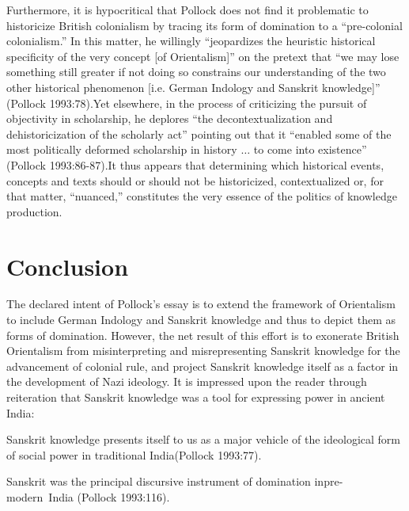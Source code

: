 Furthermore, it is hypocritical that Pollock does not find it problematic to historicize British colonialism by tracing its form of domination to a “pre-colonial colonialism.” In this matter, he willingly “jeopardizes the heuristic historical specificity of the very concept [of Orientalism]” on the pretext that “we may lose something still greater if not doing so constrains our understanding of the two other historical phenomenon [i.e. German Indology and Sanskrit knowledge]” (Pollock 1993:78).Yet elsewhere, in the process of criticizing the pursuit of objectivity in scholarship, he deplores “the decontextualization and dehistoricization of the scholarly act” pointing out that it “enabled some of the most politically deformed scholarship in history $\ldots$ to come into existence” (Pollock 1993:86-87).It thus appears that determining which historical events, concepts and texts should or should not be historicized, contextualized or, for that matter, “nuanced,” constitutes the very essence of the politics of knowledge production.

\section*{Conclusion}

The declared intent of Pollock’s essay is to extend the framework of Orientalism to include German Indology and Sanskrit knowledge and thus to depict them as forms of domination. However, the net result of this effort is to exonerate British Orientalism from misinterpreting and misrepresenting Sanskrit knowledge for the advancement of colonial rule, and project Sanskrit knowledge itself as a factor in the development of Nazi ideology. It is impressed upon the reader through reiteration that Sanskrit knowledge was a tool for expressing power in ancient India:
\begin{myquote}
Sanskrit knowledge presents itself to us as a major vehicle of the ideological form of social power in traditional India\hfill (Pollock 1993:77).
\end{myquote}

\begin{myquote}
Sanskrit was the principal discursive instrument of domination in\break pre-modern~India \hfill(Pollock 1993:116).
\end{myquote}

